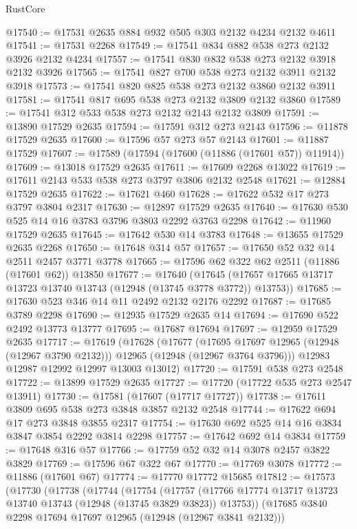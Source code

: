 \begin{lexlean}{RustCore}
\begin{coremodule}
@17540 := @17531 @2635 @884 @932 @505 @303 @2132 @4234 @2132 @4611
@17541 := @17531 @2268
@17549 := @17541 @834 @882 @538 @273 @2132 @3926 @2132 @4234
@17557 := @17541 @830 @832 @538 @273 @2132 @3918 @2132 @3926
@17565 := @17541 @827 @700 @538 @273 @2132 @3911 @2132 @3918
@17573 := @17541 @820 @825 @538 @273 @2132 @3860 @2132 @3911
@17581 := @17541 @817 @695 @538 @273 @2132 @3809 @2132 @3860
@17589 := @17541 @312 @533 @538 @273 @2132 @2143 @2132 @3809
@17591 := @13890 @17529 @2635
@17594 := @17591 @312 @273 @2143
@17596 := @11878 @17529 @2635
@17600 := @17596 @57 @273 @57 @2143
@17601 := @11887 @17529
@17607 := @17589 (@17594 (@17600 (@11886 (@17601 @57)) @11914))
@17609 := @13018 @17529 @2635
@17611 := @17609 @2268 @13022
@17619 := @17611 @2143 @533 @538 @273 @3797 @3806 @2132 @2548
@17621 := @12884 @17529 @2635
@17622 := @17621 @460
@17628 := @17622 @532 @17 @273 @3797 @3804 @2317
@17630 := @12897 @17529 @2635
@17640 := @17630 @530 @525 @14 @16 @3783 @3796 @3803 @2292 @3763 @2298
@17642 := @11960 @17529 @2635
@17645 := @17642 @530 @14 @3783
@17648 := @13655 @17529 @2635 @2268
@17650 := @17648 @314 @57
@17657 := @17650 @52 @32 @14 @2511 @2457 @3771 @3778
@17665 := @17596 @62 @322 @62 @2511 (@11886 (@17601 @62)) @13850
@17677 := @17640
    (@17645 (@17657 @17665 @13717 @13723 @13740 @13743 (@12948 (@13745 @3778 @3772)) @13753))
@17685 := @17630 @523 @346 @14 @11 @2492 @2132 @2176 @2292
@17687 := @17685 @3789 @2298
@17690 := @12935 @17529 @2635 @14
@17694 := @17690 @522 @2492 @13773 @13777
@17695 := @17687 @17694
@17697 := @12959 @17529 @2635
@17717 := @17619
    (@17628
      (@17677
        (@17695 @17697 @12965 (@12948 (@12967 @3790 @2132)))
        @12965
        (@12948 (@12967 @3764 @3796)))
      @12983
      @12987
      @12992
      @12997
      @13003
      @13012)
@17720 := @17591 @538 @273 @2548
@17722 := @13899 @17529 @2635
@17727 := @17720 (@17722 @535 @273 @2547 @13911)
@17730 := @17581 (@17607 (@17717 @17727))
@17738 := @17611 @3809 @695 @538 @273 @3848 @3857 @2132 @2548
@17744 := @17622 @694 @17 @273 @3848 @3855 @2317
@17754 := @17630 @692 @525 @14 @16 @3834 @3847 @3854 @2292 @3814 @2298
@17757 := @17642 @692 @14 @3834
@17759 := @17648 @316 @57
@17766 := @17759 @52 @32 @14 @3078 @2457 @3822 @3829
@17769 := @17596 @67 @322 @67
@17770 := @17769 @3078
@17772 := @11886 (@17601 @67)
@17774 := @17770 @17772 @15685
@17812 := @17573
    (@17730
      (@17738
        (@17744
          (@17754
            (@17757
              (@17766 @17774 @13717 @13723 @13740 @13743 (@12948 (@13745 @3829 @3823)) @13753))
            (@17685 @3840 @2298 @17694 @17697 @12965 (@12948 (@12967 @3841 @2132)))

\end{coremodule}
\end{lexlean}
